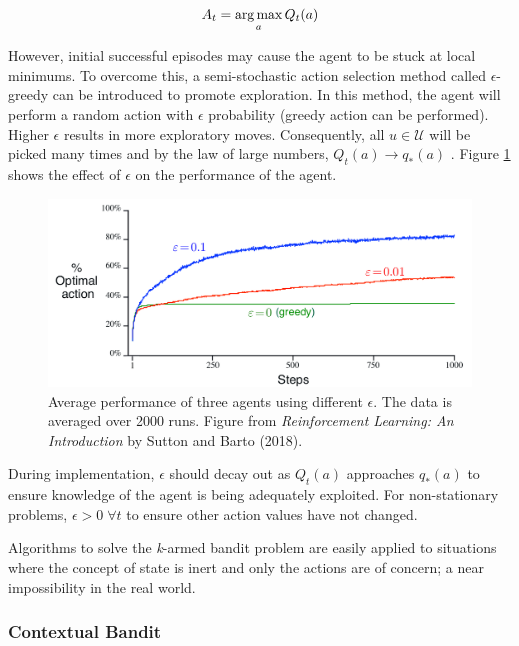\begin{equation}
    \centering
    A_t = \argmax_a Q_t(a)
    \label{eq: bandit_action_selection}
\end{equation}

However, initial successful episodes may cause the agent to be stuck at local minimums. To overcome this, a semi-stochastic action selection method called $\epsilon$-greedy can be introduced to promote exploration. In this method, the agent will perform a random action with $\epsilon$ probability (greedy action can be performed).  Higher $\epsilon$ results in more exploratory moves.  Consequently, all $u \in \mathcal{U}$ will be picked many times and by the law of large numbers, $Q_t(a) \rightarrow q_*(a)$ \cite{large_numbers}. Figure \ref{fig: eps_figure} shows the effect of $\epsilon$ on the performance of the agent.

\begin{figure}[h]
    \centering
    \includegraphics[scale=0.35]{images/eps_vs_optAction.png}
    \caption{Average performance of three agents using different $\epsilon$.  The data is averaged over 2000 runs.  Figure from \textit{Reinforcement Learning: An Introduction} by Sutton and Barto (2018).}
    \label{fig: eps_figure}
\end{figure}

During implementation, $\epsilon$ should decay out as $Q_t(a)$ approaches $q_*(a)$ to ensure knowledge of the agent is being adequately exploited. For non-stationary problems, $\epsilon > 0 \; \forall t$ to ensure other action values have not changed.

Algorithms to solve the \textit{k}-armed bandit problem are easily applied to situations where the concept of state is inert and only the actions are of concern;  a near impossibility in the real world.  

\subsubsection{Contextual Bandit}

